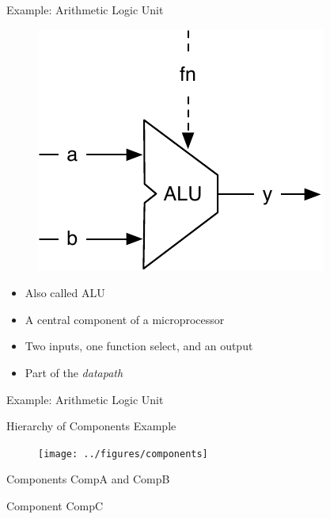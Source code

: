 \begin{frame}[fragile]{Example: Arithmetic Logic Unit}
\begin{figure}
  \includegraphics[scale=\scale]{../figures/alu}
\end{figure}
\begin{itemize}
\item Also called ALU
\item A central component of a microprocessor
\item Two inputs, one function select, and an output
\item Part of the \emph{datapath}
\end{itemize}
\end{frame}

\begin{frame}[fragile]{Example: Arithmetic Logic Unit}
\end{frame}

\begin{frame}[fragile]{Hierarchy of Components Example}
\begin{figure}
  \texttt{[image: ../figures/components]}
\end{figure}
\end{frame}

\begin{frame}[fragile]{Components CompA and CompB}
\end{frame}

\begin{frame}[fragile]{Component CompC}
\end{frame}










